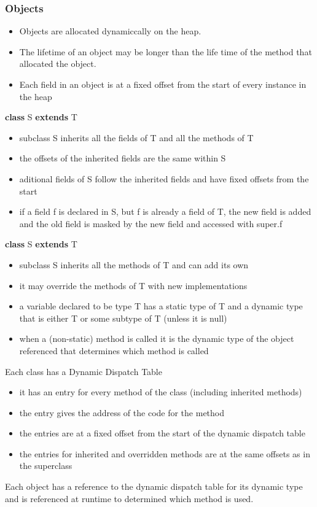 \subsubsection{Objects}
\begin{itemize}
    \item Objects are allocated dynamiccally on the heap.
    \item The lifetime of an object may be longer than the life time of the 
    method that allocated the object.
    \item Each field in an object is at a fixed offset from the start of 
    every instance in the heap
\end{itemize}

\textbf{class} S \textbf{extends} T
\begin{itemize}
    \item subclass S inherits all the fields of T and all the methods of T
    \item the offsets of the inherited fields are the same within S
    \item aditional fields of S follow the inherited fields and have fixed 
    offsets from the start
    \item if a field f is declared in S, but f is already a field of T,
    the new field is added and the old field is masked by the new field and 
    accessed with super.f
\end{itemize}

\textbf{class} S \textbf{extends} T
\begin{itemize}
    \item subclass S inherits all the methods of T and can add its own
    \item it may override the methods of T with new implementations
    \item a variable declared to be type T has a static type of T and a dynamic 
    type that is either T or some subtype of T (unless it is null)
    \item when a (non-static) method is called it is the dynamic type of the 
    object referenced that determines which method is called
\end{itemize}

Each class has a Dynamic Dispatch Table
\begin{itemize}
    \item it has an entry for every method of the class (including inherited 
    methods)
    \item the entry gives the address of the code for the method
    \item the entries are at a fixed offset from the start of the dynamic 
    dispatch table
    \item the entries for inherited and overridden methods are at the same 
    offsets as in the superclass
\end{itemize}
Each object has a reference to the dynamic dispatch table for its dynamic type
and is referenced at runtime to determined which method is used.


